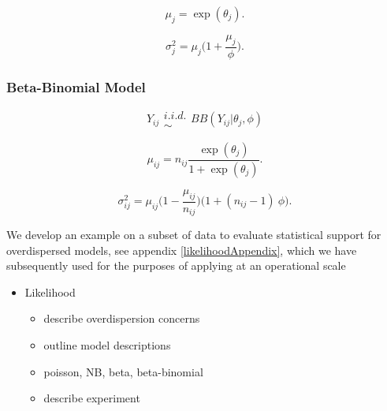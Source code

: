 \documentclass[12pt]{article}
\begin{document}
%
\begin{equation}
\mu_{j} = \exp(\theta_{j}). %
\end{equation}

%
\begin{equation}
\sigma^2_{j} = \mu_{j}\Big(1+\frac{\mu_{j}}{\phi}\Big).
\end{equation}

%
\subsubsection{Beta-Binomial Model}

%
\begin{equation}
Y_{ij} \substack{i.i.d.\\\sim} BB(Y_{ij}|\theta_{j}, \phi)
\end{equation}

%
\begin{equation}
\mu_{ij} = n_{ij}\frac{\exp(\theta_{j})}{1+\exp(\theta_{j})}.
\end{equation}

%
\begin{equation}
\sigma^2_{ij} = \mu_{ij}\Big(1-\frac{\mu_{ij}}{n_{ij}}\Big)\Big(1+(n_{ij}-1)~\phi\Big).
\end{equation}


We develop an example on a subset of data to evaluate statistical support for 
overdispersed models, see appendix \ref{likelihoodAppendix}, which we have subsequently used for the purposes of applying at an operational scale 

\begin{itemize}
\item Likelihood
	\begin{itemize}
	\item describe overdispersion concerns
	\item outline model descriptions
	\item poisson, NB, beta, beta-binomial
	\item describe experiment
	\end{itemize}
\end{itemize}

\end{document}
